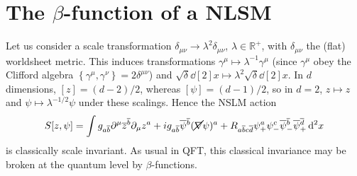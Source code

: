 
\section{The \texorpdfstring{$\beta$}{beta}-function of a NLSM}%
\label{sec:the_beta_function_of_a_nlsm}

Let us consider a scale transformation $\delta_{\mu\nu} \to \lambda^2 \delta_{\mu\nu}$, $\lambda \in \mathbb{R}^+$, with $\delta_{\mu\nu}$ the (flat) worldsheet metric. This induces transformations $\gamma^{\mu} \mapsto \lambda^{-1} \gamma^{\mu}$ (since $\gamma^{\mu}$ obey the Clifford algebra $\left\{\gamma^{\mu}, \gamma^{\nu}\right\} = 2 \delta^{\mu\nu}$) and $\sqrt{\delta} \dd[2]{x} \mapsto \lambda^2 \sqrt{\delta} \dd[2]{x}$. In $d$ dimensions, $[z] = (d - 2) / 2$, whereas $[\psi] = (d - 1) /2$, so in $d = 2$, $z \mapsto z$ and $\psi \mapsto \lambda^{-1 / 2} \psi$ under these scalings. Hence the NSLM action
\begin{equation}
  S[z, \psi] = \int g_{a \overline{b}{}} \partial^{\mu} \overline{z}{}^{\overline{b}{}} \partial_{\mu} z^{a} + i g_{a \overline{b}{}} \overline{\psi}{}^{\overline{b}{}} (\cancel{\nabla} \psi)^{a} + R_{a \overline{b}{} c \overline{d}{}} \psi^{a}_{+} \psi^{c}_- \overline{\psi}{}^{\overline{b}{}}_- \overline{\psi}{}^{\overline{d}{}}_+ \dd[2]{x}
\end{equation}
is classically scale invariant. As usual in QFT, this classical invariance may be broken at the quantum level by $\beta$-functions. 

